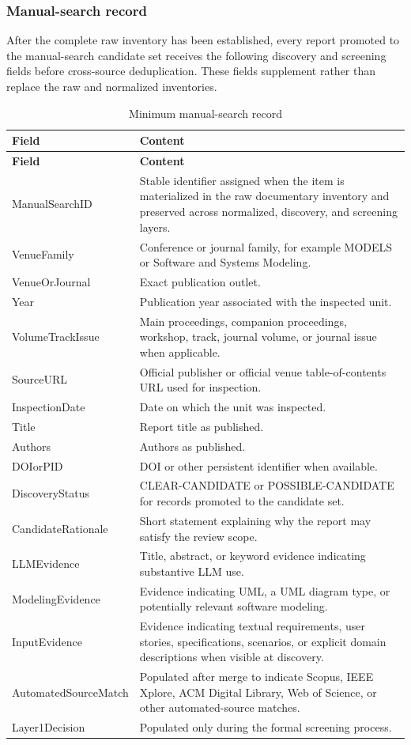 \subsubsection{Manual-search record}

After the complete raw inventory has been established, every report promoted to the manual-search
candidate set receives the following discovery and screening fields before cross-source
deduplication. These fields supplement rather than replace the raw and normalized inventories.

\begin{longtable}{p{} p{}}
\caption{Minimum manual-search record}
\label{tab:manual_search_fields}\\
\toprule
\textbf{Field} & \textbf{Content} \\
\midrule
\endfirsthead
\toprule
\textbf{Field} & \textbf{Content} \\
\midrule
\endhead
ManualSearchID & Stable identifier assigned when the item is materialized in the raw documentary inventory and preserved across normalized, discovery, and screening layers. \\
VenueFamily & Conference or journal family, for example MODELS or Software and Systems Modeling. \\
VenueOrJournal & Exact publication outlet. \\
Year & Publication year associated with the inspected unit. \\
VolumeTrackIssue & Main proceedings, companion proceedings, workshop, track, journal volume, or journal issue when applicable. \\
SourceURL & Official publisher or official venue table-of-contents URL used for inspection. \\
InspectionDate & Date on which the unit was inspected. \\
Title & Report title as published. \\
Authors & Authors as published. \\
DOIorPID & DOI or other persistent identifier when available. \\
DiscoveryStatus & CLEAR-CANDIDATE or POSSIBLE-CANDIDATE for records promoted to the candidate set. \\
CandidateRationale & Short statement explaining why the report may satisfy the review scope. \\
LLMEvidence & Title, abstract, or keyword evidence indicating substantive LLM use. \\
ModelingEvidence & Evidence indicating UML, a UML diagram type, or potentially relevant software modeling. \\
InputEvidence & Evidence indicating textual requirements, user stories, specifications, scenarios, or explicit domain descriptions when visible at discovery. \\
AutomatedSourceMatch & Populated after merge to indicate Scopus, IEEE Xplore, ACM Digital Library, Web of Science, or other automated-source matches. \\
Layer1Decision & Populated only during the formal screening process. \\
\bottomrule
\end{longtable}

